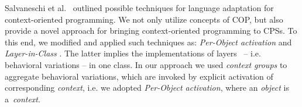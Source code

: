 Salvaneschi et al.~\cite{Salvaneschi11,Salvaneschi12} outlined possible
techniques for language adaptation for context-oriented programming. We
not only utilize concepts of COP, but also provide a novel approach for
bringing context-oriented programming to CPSs. To this end, we modified and
applied such techniques as: \emph{Per-Object activation} and
\emph{Layer-in-Class} \cite{Salvaneschi12}. The latter implies the
implementations of layers~\cite{Costanza11} -- i.e. behavioral variations -- in
one class. In our approach we used \emph{context groups} to aggregate behavioral
variations, which are invoked by explicit activation of corresponding
\emph{context}, i.e. we adopted \emph{Per-Object activation}, where an
\emph{object} is a~\emph{context}.
